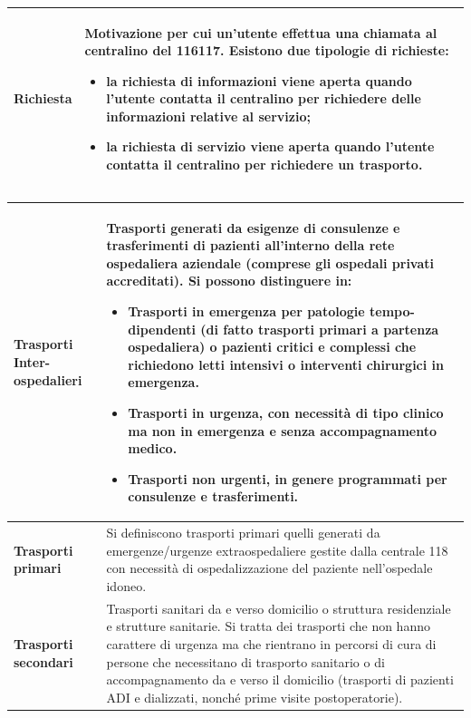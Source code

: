 \documentclass[12pt]{article}
\begin{document}
\begin{tabular}{|p{4cm}|p{11cm}|}
\hline
\textbf{Richiesta} & Motivazione per cui un'utente effettua una chiamata al centralino del 116117. Esistono due tipologie di richieste: 
\begin{itemize}
    \item la richiesta di informazioni viene aperta quando l'utente contatta il centralino per richiedere delle informazioni relative al servizio;
    \item la richiesta di servizio viene aperta quando l'utente contatta il centralino per richiedere un trasporto.
\end{itemize}\\

\hline 
\end{tabular}

\begin{tabular}{|p{4cm}|p{11cm}|}


\hline
\textbf{Trasporti Inter-ospedalieri } & Trasporti generati da esigenze di consulenze e trasferimenti di pazienti all'interno della rete ospedaliera aziendale (comprese gli ospedali privati accreditati). Si possono distinguere in:
\begin{itemize}
    \item Trasporti in emergenza per patologie tempo-dipendenti (di fatto trasporti primari a partenza ospedaliera) o pazienti critici e complessi che richiedono letti intensivi o interventi chirurgici in emergenza.
    \item Trasporti in urgenza, con necessità di tipo clinico ma non in emergenza e senza accompagnamento medico.
    \item Trasporti non urgenti, in genere programmati per consulenze e trasferimenti.
\end{itemize}\\

\hline
\textbf{ Trasporti primari } & Si definiscono trasporti primari quelli generati da emergenze/urgenze extraospedaliere gestite dalla centrale 118 con necessità di ospedalizzazione del paziente nell'ospedale idoneo.\\

\hline
\textbf{Trasporti secondari} & Trasporti sanitari da e verso domicilio o struttura residenziale e strutture sanitarie. Si tratta dei trasporti che non hanno carattere di urgenza ma che rientrano in percorsi di cura di persone che necessitano di trasporto sanitario o di accompagnamento da e verso il domicilio (trasporti di pazienti ADI e dializzati, nonché prime visite postoperatorie).\\


\end{tabular}
\end{document}
